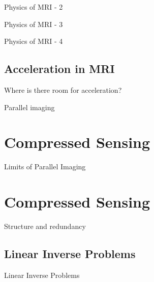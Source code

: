 \documentclass[aspectratio=169,xcolor=dvipsnames]{beamer}
\begin{document}
\begin{frame}{Physics of MRI - 2}
\end{frame}

\begin{frame}{Physics of MRI - 3}
\end{frame}

\begin{frame}{Physics of MRI - 4}
\end{frame}

\subsection{Acceleration in MRI}
\begin{frame}{Where is there room for acceleration?}
\end{frame}

\begin{frame}{Parallel imaging}
\end{frame}

\section{Compressed Sensing}
\begin{frame}{Limits of Parallel Imaging}
\end{frame}

\section{Compressed Sensing}
\begin{frame}{Structure and redundancy}
\end{frame}

\subsection{Linear Inverse Problems}
\begin{frame}{Linear Inverse Problems}
\end{frame}
\end{document}
